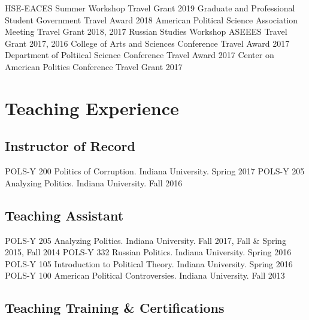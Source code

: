 \documentclass[11pt,]{article}
\begin{document}
\vspace{-2mm}

HSE-EACES Summer Workshop Travel Grant \hfill 2019 \newline Graduate and
Professional Student Government Travel Award \hfill 2018 \newline
American Political Science Association Meeting Travel Grant \hfill 2018,
2017 \newline Russian Studies Workshop ASEEES Travel Grant \hfill 2017,
2016 \newline College of Arts and Sciences Conference Travel Award
\hfill 2017 \newline Department of Poltiical Science Conference Travel
Award \hfill 2017 \newline Center on American Politics Conference Travel
Grant \hfill 2017

\hypertarget{teaching-experience}{%
\section{Teaching Experience}\label{teaching-experience}}

\hypertarget{instructor-of-record}{%
\subsection{Instructor of Record}\label{instructor-of-record}}

POLS-Y 200 Politics of Corruption. Indiana University. \hfill Spring
2017 \newline POLS-Y 205 Analyzing Politics. Indiana University.
\hfill Fall 2016

\hypertarget{teaching-assistant}{%
\subsection{Teaching Assistant}\label{teaching-assistant}}

POLS-Y 205 Analyzing Politics. Indiana University. \hfill Fall 2017,
Fall \& Spring 2015, Fall 2014 \newline POLS-Y 332 Russian Politics.
Indiana University. \hfill Spring 2016 \newline POLS-Y 105 Introduction
to Political Theory. Indiana University. \hfill Spring 2016 \newline
POLS-Y 100 American Political Controversies. Indiana University.
\hfill Fall 2013

\hypertarget{teaching-training-certifications}{%
\subsection{Teaching Training \&
Certifications}\label{teaching-training-certifications}}
\end{document}
